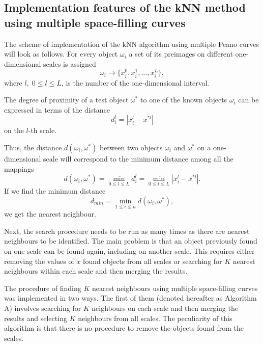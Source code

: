 \documentclass[entropy,article,submit,moreauthors,pdftex]{Definitions/mdpi}
\begin{document}
\begin{paracol}{2}
\linenumbers
\switchcolumn

\section{Implementation features of the kNN method using multiple space-filling curves}\label{knnme}

The scheme of implementation of the kNN algorithm using multiple Peano curves will look as follows.
For every object $\omega_i$ a set of its preimages on different one-dimensional scales is assigned 
\[
\omega_i \rightarrow \{ x_i^0, x_i^1, ..., x_i^L \},
\] 
where $l, \; 0 \leq l \leq L$, is the number of the one-dimensional interval.

The degree of proximity of a test object $\omega^*$ to one of the known objects $\omega_i$ can be expressed in terms of the distance
\[
d_i^l = |x_i^l - x^{*l}|
\]
on the $l$-th scale.

Thus, the distance $d(\omega_i,\omega^*)$ between two objects $\omega_i$ and $\omega^*$ on a one-dimensional scale will correspond to the minimum distance among all the mappings 
\[
d(\omega_i,\omega^*) = \min_{0\leq l\leq L} d_i^l = \min_{0\leq l\leq L}  |x_i^l - x^{*l}| .
\]
If we find the minimum distance
\[
d_{min} = \min_{1\leq i\leq n} d(\omega_i,\omega^*) ,
\]
we get the nearest neighbour.

Next, the search procedure needs to be run as many times as there are nearest neighbours to be identified. The main problem is that an object previously found on one scale can be found again, including on another scale. This requires either removing the values of $x$ found objects from all scales or searching for $K$ nearest neighbours within each scale and then merging the results.



The procedure of finding $K$ nearest neighbours using multiple space-filling curves was implemented in two ways. The first of them (denoted hereafter as Algorithm A) involves searching for $K$ neighbours on each scale and then merging the results and selecting $K$ neighbours from all scales. The peculiarity of this algorithm is that there is no procedure to remove the objects found from the scales.


\end{paracol}
\end{document}
